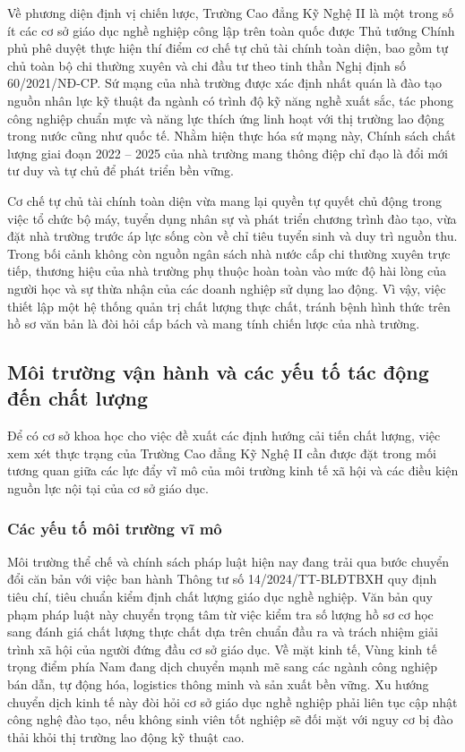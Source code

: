 Về phương diện định vị chiến lược, Trường Cao đẳng Kỹ Nghệ II là một trong số ít các cơ sở giáo dục nghề nghiệp công lập trên toàn quốc được Thủ tướng Chính phủ phê duyệt thực hiện thí điểm cơ chế tự chủ tài chính toàn diện, bao gồm tự chủ toàn bộ chi thường xuyên và chi đầu tư theo tinh thần Nghị định số 60/2021/NĐ-CP. Sứ mạng của nhà trường được xác định nhất quán là đào tạo nguồn nhân lực kỹ thuật đa ngành có trình độ kỹ năng nghề xuất sắc, tác phong công nghiệp chuẩn mực và năng lực thích ứng linh hoạt với thị trường lao động trong nước cũng như quốc tế. Nhằm hiện thực hóa sứ mạng này, Chính sách chất lượng giai đoạn 2022 -- 2025 của nhà trường mang thông điệp chỉ đạo là đổi mới tư duy và tự chủ để phát triển bền vững.

Cơ chế tự chủ tài chính toàn diện vừa mang lại quyền tự quyết chủ động trong việc tổ chức bộ máy, tuyển dụng nhân sự và phát triển chương trình đào tạo, vừa đặt nhà trường trước áp lực sống còn về chỉ tiêu tuyển sinh và duy trì nguồn thu. Trong bối cảnh không còn nguồn ngân sách nhà nước cấp chi thường xuyên trực tiếp, thương hiệu của nhà trường phụ thuộc hoàn toàn vào mức độ hài lòng của người học và sự thừa nhận của các doanh nghiệp sử dụng lao động. Vì vậy, việc thiết lập một hệ thống quản trị chất lượng thực chất, tránh bệnh hình thức trên hồ sơ văn bản là đòi hỏi cấp bách và mang tính chiến lược của nhà trường.

\subsection{Môi trường vận hành và các yếu tố tác động đến chất lượng}

Để có cơ sở khoa học cho việc đề xuất các định hướng cải tiến chất lượng, việc xem xét thực trạng của Trường Cao đẳng Kỹ Nghệ II cần được đặt trong mối tương quan giữa các lực đẩy vĩ mô của môi trường kinh tế xã hội và các điều kiện nguồn lực nội tại của cơ sở giáo dục.

\subsubsection{Các yếu tố môi trường vĩ mô}

Môi trường thể chế và chính sách pháp luật hiện nay đang trải qua bước chuyển đổi căn bản với việc ban hành Thông tư số 14/2024/TT-BLĐTBXH quy định tiêu chí, tiêu chuẩn kiểm định chất lượng giáo dục nghề nghiệp. Văn bản quy phạm pháp luật này chuyển trọng tâm từ việc kiểm tra số lượng hồ sơ cơ học sang đánh giá chất lượng thực chất dựa trên chuẩn đầu ra và trách nhiệm giải trình xã hội của người đứng đầu cơ sở giáo dục. Về mặt kinh tế, Vùng kinh tế trọng điểm phía Nam đang dịch chuyển mạnh mẽ sang các ngành công nghiệp bán dẫn, tự động hóa, logistics thông minh và sản xuất bền vững. Xu hướng chuyển dịch kinh tế này đòi hỏi cơ sở giáo dục nghề nghiệp phải liên tục cập nhật công nghệ đào tạo, nếu không sinh viên tốt nghiệp sẽ đối mặt với nguy cơ bị đào thải khỏi thị trường lao động kỹ thuật cao.

